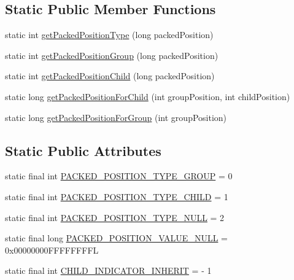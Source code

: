 \subsection*{Static Public Member Functions}
\begin{DoxyCompactItemize}
\item 
static int \hyperlink{classit_1_1sephiroth_1_1android_1_1library_1_1widget_1_1_expandable_h_list_view_ae574c6efbf83f1bb3d588c13a7bd0ef1}{get\+Packed\+Position\+Type} (long packed\+Position)
\item 
static int \hyperlink{classit_1_1sephiroth_1_1android_1_1library_1_1widget_1_1_expandable_h_list_view_ada2257e0f53c0c4dfe19c7e0fa155aad}{get\+Packed\+Position\+Group} (long packed\+Position)
\item 
static int \hyperlink{classit_1_1sephiroth_1_1android_1_1library_1_1widget_1_1_expandable_h_list_view_a9325b28ae11af4325839c0a15e640152}{get\+Packed\+Position\+Child} (long packed\+Position)
\item 
static long \hyperlink{classit_1_1sephiroth_1_1android_1_1library_1_1widget_1_1_expandable_h_list_view_a37af0955cf4697ca1af59fbceff91fda}{get\+Packed\+Position\+For\+Child} (int group\+Position, int child\+Position)
\item 
static long \hyperlink{classit_1_1sephiroth_1_1android_1_1library_1_1widget_1_1_expandable_h_list_view_a4a66c5a45d940fb451591d3930f4fbab}{get\+Packed\+Position\+For\+Group} (int group\+Position)
\end{DoxyCompactItemize}
\subsection*{Static Public Attributes}
\begin{DoxyCompactItemize}
\item 
static final int \hyperlink{classit_1_1sephiroth_1_1android_1_1library_1_1widget_1_1_expandable_h_list_view_adf5d28b1cc2f760523bbfc9aeb69d453}{P\+A\+C\+K\+E\+D\+\_\+\+P\+O\+S\+I\+T\+I\+O\+N\+\_\+\+T\+Y\+P\+E\+\_\+\+G\+R\+O\+UP} = 0
\item 
static final int \hyperlink{classit_1_1sephiroth_1_1android_1_1library_1_1widget_1_1_expandable_h_list_view_afbbb060d5013f38b6aef1c2f69e14524}{P\+A\+C\+K\+E\+D\+\_\+\+P\+O\+S\+I\+T\+I\+O\+N\+\_\+\+T\+Y\+P\+E\+\_\+\+C\+H\+I\+LD} = 1
\item 
static final int \hyperlink{classit_1_1sephiroth_1_1android_1_1library_1_1widget_1_1_expandable_h_list_view_a78d71758dda75d71811671cc7f176152}{P\+A\+C\+K\+E\+D\+\_\+\+P\+O\+S\+I\+T\+I\+O\+N\+\_\+\+T\+Y\+P\+E\+\_\+\+N\+U\+LL} = 2
\item 
static final long \hyperlink{classit_1_1sephiroth_1_1android_1_1library_1_1widget_1_1_expandable_h_list_view_a625409dd43a10f9bee03a2fa43d5243a}{P\+A\+C\+K\+E\+D\+\_\+\+P\+O\+S\+I\+T\+I\+O\+N\+\_\+\+V\+A\+L\+U\+E\+\_\+\+N\+U\+LL} = 0x00000000\+F\+F\+F\+F\+F\+F\+F\+FL
\item 
static final int \hyperlink{classit_1_1sephiroth_1_1android_1_1library_1_1widget_1_1_expandable_h_list_view_af35f34d7eb108c004b2b844e4407dc3b}{C\+H\+I\+L\+D\+\_\+\+I\+N\+D\+I\+C\+A\+T\+O\+R\+\_\+\+I\+N\+H\+E\+R\+IT} = -\/ 1
\end{DoxyCompactItemize}
